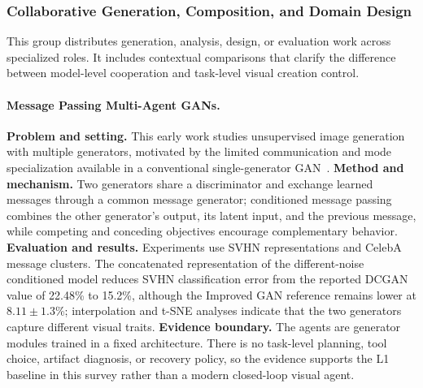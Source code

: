 \subsubsection{Collaborative Generation, Composition, and Domain Design}
This group distributes generation, analysis, design, or evaluation work across specialized roles. It includes contextual comparisons that clarify the difference between model-level cooperation and task-level visual creation control.

\paragraph{Message Passing Multi-Agent GANs.}
\textbf{Problem and setting.} This early work studies unsupervised image generation with multiple generators, motivated by the limited communication and mode specialization available in a conventional single-generator GAN~\cite{avg161201294}. \textbf{Method and mechanism.} Two generators share a discriminator and exchange learned messages through a common message generator; conditioned message passing combines the other generator's output, its latent input, and the previous message, while competing and conceding objectives encourage complementary behavior. \textbf{Evaluation and results.} Experiments use SVHN representations and CelebA message clusters. The concatenated representation of the different-noise conditioned model reduces SVHN classification error from the reported DCGAN value of 22.48\% to 15.2\%, although the Improved GAN reference remains lower at $8.11\pm1.3$\%; interpolation and t-SNE analyses indicate that the two generators capture different visual traits. \textbf{Evidence boundary.} The agents are generator modules trained in a fixed architecture. There is no task-level planning, tool choice, artifact diagnosis, or recovery policy, so the evidence supports the L1 baseline in this survey rather than a modern closed-loop visual agent.

